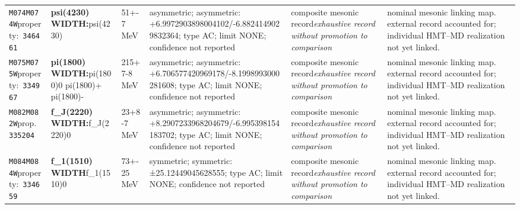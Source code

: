 \begin{landscape}
\begin{longtable}{L{1.85cm}L{4.45cm}L{2.35cm}L{4.05cm}L{3.35cm}L{7.15cm}}
\texttt{M074}\newline \texttt{M074W}\newline property:\ \texttt{346461} & \textbf{psi(4230) WIDTH:}\newline psi(4230) & 51+-7\,MeV & asymmetric; asymmetric: +6.9972903898004102/-6.8824149029832364; type AC; limit NONE; confidence not reported & composite mesonic record\newline \emph{exhaustive record without promotion to comparison} & nominal mesonic linking map. external record accounted for; individual HMT--MD realization not yet linked. \\
\texttt{M075}\newline \texttt{M075W}\newline property:\ \texttt{334967} & \textbf{pi(1800) WIDTH:}\newline pi(1800)0 \textbar{}\allowbreak{} pi(1800)+ \textbar{}\allowbreak{} pi(1800)- & 215+7-8\,MeV & asymmetric; asymmetric: +6.706577420969178/-8.1998993000281608; type AC; limit NONE; confidence not reported & composite mesonic record\newline \emph{exhaustive record without promotion to comparison} & nominal mesonic linking map. external record accounted for; individual HMT--MD realization not yet linked. \\
\texttt{M082}\newline \texttt{M082W}\newline prop.\ \texttt{335204} & \textbf{f\_\allowbreak{}J(2220) WIDTH:}\newline f\_\allowbreak{}J(2220)0 & 23+8-7\,MeV & asymmetric; asymmetric: +8.2907233968204679/-6.995398154183702; type AC; limit NONE; confidence not reported & composite mesonic record\newline \emph{exhaustive record without promotion to comparison} & nominal mesonic linking map. external record accounted for; individual HMT--MD realization not yet linked. \\
\texttt{M084}\newline \texttt{M084W}\newline property:\ \texttt{334659} & \textbf{f\_\allowbreak{}1(1510) WIDTH}\newline f\_\allowbreak{}1(1510)0 & 73+-25\,MeV & symmetric; symmetric: ±25.12449045628555; type AC; limit NONE; confidence not reported & composite mesonic record\newline \emph{exhaustive record without promotion to comparison} & nominal mesonic linking map. external record accounted for; individual HMT--MD realization not yet linked. \\

\end{longtable}
\end{landscape}
